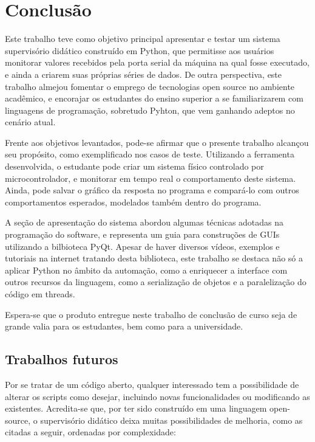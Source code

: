 \chapter{Conclusão}

Este trabalho teve como objetivo principal apresentar e testar um sistema supervisório didático construído em Python, que permitisse aos usuários monitorar valores recebidos pela porta serial da máquina na qual fosse executado, e ainda a criarem suas próprias séries de dados. De outra perspectiva, este trabalho almejou fomentar o emprego de tecnologias open source no ambiente acadêmico, e encorajar os estudantes do ensino superior a se familiarizarem com linguagens de programação, sobretudo Pyhton, que vem ganhando adeptos no cenário atual.

Frente aos objetivos levantados, pode-se afirmar que o presente trabalho alcançou seu propósito, como exemplificado nos casos de teste. Utilizando a ferramenta desenvolvida, o estudante pode criar um sistema físico controlado por microcontrolador, e monitorar em tempo real o comportamento deste sistema. Ainda, pode salvar o gráfico da resposta no programa e compará-lo com outros comportamentos esperados, modelados também dentro do programa.

A seção de apresentação do sistema abordou algumas técnicas adotadas na programação do software, e representa um guia para construções de GUIs utilizando a bilbioteca PyQt. Apesar de haver diversos vídeos, exemplos e tutoriais na internet tratando desta biblioteca, este trabalho se destaca não só a aplicar Python no âmbito da automação, como a enriquecer a interface com outros recursos da linguagem, como a serialização de objetos e a paralelização do código em threads.

Espera-se que o produto entregue neste trabalho de conclusão de curso seja de grande valia para os estudantes, bem como para a universidade.

\section{Trabalhos futuros}

Por se tratar de um código aberto, qualquer interessado tem a possibilidade de alterar os scripts como desejar, incluindo novas funcionalidades ou modificando as existentes. Acredita-se que, por ter sido construído em uma linguagem open-source, o supervisório didático deixa muitas possibilidades de melhoria, como as citadas a seguir, ordenadas por complexidade:

